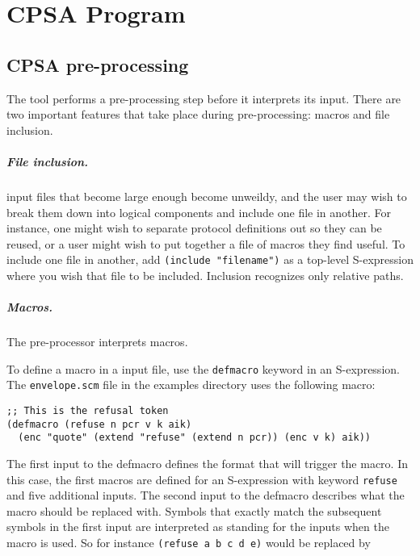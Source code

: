 \chapter{CPSA Program}
\label{ch:input}

\section{CPSA pre-processing}

The {\cpsa} tool performs a pre-processing step before it interprets
its input.  There are two important features that take place during
pre-processing: macros and file inclusion.

\paragraph{File inclusion.}
 {\cpsa} input files that become large enough become
unweildy, and the user may wish to break them down into logical
components and include one file in another.  For instance, one might
wish to separate protocol definitions out so they can be reused, or
a user might wish to put together a file of macros they find useful.
To include one file in another, add \texttt{(include "filename")}
as a top-level S-expression where you wish that file to be included.
Inclusion recognizes only relative paths.

\paragraph{Macros.}
  The {\cpsa} pre-processor interprets
macros.

To define a macro in a {\cpsa} input file, use the \texttt{defmacro}
keyword in an S-expression.  The \texttt{envelope.scm} file in the
examples directory uses the following macro:

\begin{verbatim}
;; This is the refusal token
(defmacro (refuse n pcr v k aik)
  (enc "quote" (extend "refuse" (extend n pcr)) (enc v k) aik))
\end{verbatim}

The first input to the defmacro defines the format that will trigger
the macro.  In this case, the first macros are defined for an
S-expression with keyword \texttt{refuse} and five additional inputs.
The second input to the defmacro describes what the macro should be
replaced with.  Symbols that exactly match the subsequent symbols in
the first input are interpreted as standing for the inputs when the
macro is used.  So for instance \texttt{(refuse a b c d e)} would be
replaced by

